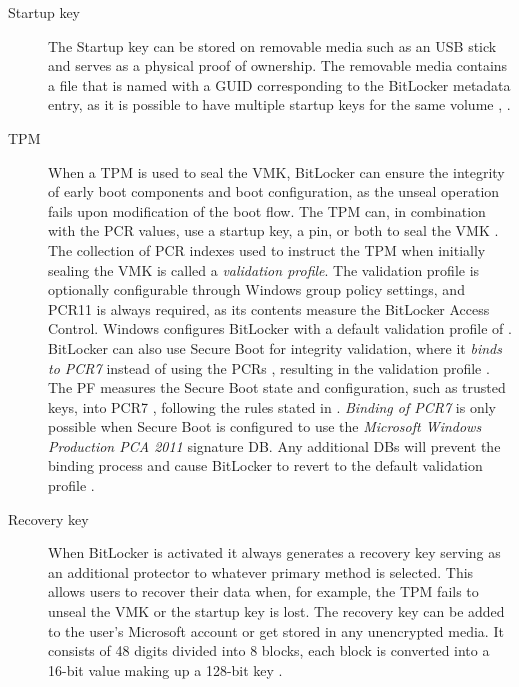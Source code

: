 \begin{description}
    \item[Startup key] The Startup key can be stored on removable media such as an \ac{USB} stick and serves as a physical proof of ownership.
        The removable media contains a  file that is named with a \ac{GUID} corresponding to the BitLocker metadata entry, as it is possible to have multiple startup keys for the same volume \cite[Section 2.6]{bde-format-spec}, \cite{microsoft-windows-prepare-your-org}.

    \item[TPM]
        When a \ac{TPM} is used to seal the \ac{VMK}, BitLocker can ensure the integrity of early boot components and boot configuration, as the unseal operation fails upon modification of the boot flow.
        The \ac{TPM} can, in combination with the \ac{PCR} values, use a startup key, a pin, or both to seal the \ac{VMK} \cite{microsoft-bitlocker-countermeasures}.
        The collection of \ac{PCR} indexes used to instruct the \ac{TPM} when initially sealing the \ac{VMK} is called a \emph{validation profile}.
        The validation profile is optionally configurable through Windows group policy settings, and \ac{PCR}11 is always required, as its contents measure the BitLocker Access Control.
        Windows configures BitLocker with a default validation profile of \hyperref[tab:pcr-usage]{} \cite{microsoft-windows-bitlocker-group-policy-settings}.
        BitLocker can also use Secure Boot for integrity validation, where it \hypertarget{pcr7-binding}{\emph{binds to \ac{PCR}7}} instead of using the \acp{PCR} \hyperref[tab:pcr-usage]{}, resulting in the validation profile \hyperref[tab:pcr-usage]{} \cite{microsoft-windows-bitlocker-group-policy-settings-pcr7}.
        The \ac{PF} measures the Secure Boot state and configuration, such as trusted keys, into \ac{PCR}7 \cite{microsoft-windows-bitlocker-group-policy-settings-pcr7}, following the rules stated in \cite{microsoft-trusted-execution-environment}.
        \emph{Binding of \ac{PCR}7} is only possible when Secure Boot is configured to use the \emph{Microsoft Windows Production PCA 2011} signature \ac{DB}. Any additional \acp{DB} will prevent the binding process and cause BitLocker to revert to the default validation profile \cite{microsoft-pcr7-binding}.

    \item[Recovery key]
        When BitLocker is activated it always generates a recovery key serving as an additional protector to whatever primary method is selected.
        This allows users to recover their data when, for example, the \ac{TPM} fails to unseal the \ac{VMK} or the startup key is lost.
        The recovery key can be added to the user's Microsoft account or get stored in any unencrypted media.
        It consists of 48 digits divided into 8 blocks, each block is converted into a 16-bit value making up a 128-bit key \cite[Section 2.4]{bde-format-spec}.


\end{description}
